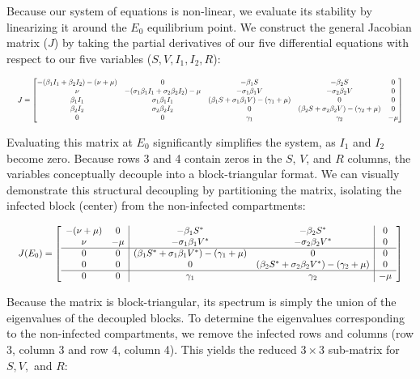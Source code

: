 \documentclass[12pt]{article}
\begin{document}
Because our system of equations is non-linear, we evaluate its stability by linearizing it around the $E_0$ equilibrium point. We construct the general Jacobian matrix ($J$) by taking the partial derivatives of our five differential equations with respect to our five variables ($S, V, I_1, I_2, R$):

\begin{equation}
\resizebox{\textwidth}{!}{
$J = \begin{bmatrix}
-(\beta_1 I_1 + \beta_2 I_2) - (\nu + \mu) & 0 & -\beta_1 S & -\beta_2 S & 0 \\
\nu & -(\sigma_1 \beta_1 I_1 + \sigma_2 \beta_2 I_2) - \mu & -\sigma_1 \beta_1 V & -\sigma_2 \beta_2 V & 0 \\
\beta_1 I_1 & \sigma_1 \beta_1 I_1 & (\beta_1 S + \sigma_1 \beta_1 V) - (\gamma_1 + \mu) & 0 & 0 \\
\beta_2 I_2 & \sigma_2 \beta_2 I_2 & 0 & (\beta_2 S + \sigma_2 \beta_2 V) - (\gamma_2 + \mu) & 0 \\
0 & 0 & \gamma_1 & \gamma_2 & -\mu
\end{bmatrix}$
}
\end{equation}

Evaluating this matrix at $E_0$ significantly simplifies the system, as $I_1$ and $I_2$ become zero. Because rows 3 and 4 contain zeros in the $S$, $V$, and $R$ columns, the variables conceptually decouple into a block-triangular format. We can visually demonstrate this structural decoupling by partitioning the matrix, isolating the infected block (center) from the non-infected compartments:

\begin{equation}
\resizebox{\textwidth}{!}{
$J(E_0) = \left[
\begin{array}{cc|cc|c}
-(\nu + \mu) & 0 & -\beta_1 S^* & -\beta_2 S^* & 0 \\
\nu & -\mu & -\sigma_1 \beta_1 V^* & -\sigma_2 \beta_2 V^* & 0 \\
\hline
0 & 0 & (\beta_1 S^* + \sigma_1 \beta_1 V^*) - (\gamma_1 + \mu) & 0 & 0 \\
0 & 0 & 0 & (\beta_2 S^* + \sigma_2 \beta_2 V^*) - (\gamma_2 + \mu) & 0 \\
\hline
0 & 0 & \gamma_1 & \gamma_2 & -\mu
\end{array}
\right]$
}
\end{equation}

Because the matrix is block-triangular, its spectrum is simply the union of the eigenvalues of the decoupled blocks. To determine the eigenvalues corresponding to the non-infected compartments, we remove the infected rows and columns (row 3, column 3 and row 4, column 4). This yields the reduced $3 \times 3$ sub-matrix for $S, V,$ and $R$:
\end{document}

